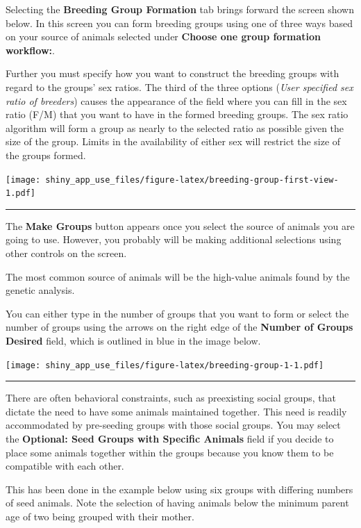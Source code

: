 \documentclass[
]{article}
\begin{document}
Selecting the \textbf{Breeding Group Formation} tab brings forward the
screen shown below. In this screen you can form breeding groups using
one of three ways based on your source of animals selected under
\textbf{Choose one group formation workflow:}.

Further you must specify how you want to construct the breeding groups
with regard to the groups' sex ratios. The third of the three options
(\emph{User specified sex ratio of breeders}) causes the appearance of
the field where you can fill in the sex ratio (F/M) that you want to
have in the formed breeding groups. The sex ratio algorithm will form a
group as nearly to the selected ratio as possible given the size of the
group. Limits in the availability of either sex will restrict the size
of the groups formed.

\texttt{[image: shiny\_app\_use\_files/figure-latex/breeding-group-first-view-1.pdf]}

\begin{center}\rule{0.5\linewidth}{\linethickness}\end{center}

The \textbf{Make Groups} button appears once you select the source of
animals you are going to use. However, you probably will be making
additional selections using other controls on the screen.

The most common source of animals will be the high-value animals found
by the genetic analysis.

You can either type in the number of groups that you want to form or
select the number of groups using the arrows on the right edge of the
\textbf{Number of Groups Desired} field, which is outlined in blue in
the image below.

\texttt{[image: shiny\_app\_use\_files/figure-latex/breeding-group-1-1.pdf]}

\begin{center}\rule{0.5\linewidth}{\linethickness}\end{center}

There are often behavioral constraints, such as preexisting social
groups, that dictate the need to have some animals maintained together.
This need is readily accommodated by pre-seeding groups with those
social groups. You may select the \textbf{Optional: Seed Groups with
Specific Animals} field if you decide to place some animals together
within the groups because you know them to be compatible with each
other.

This has been done in the example below using six groups with differing
numbers of seed animals. Note the selection of having animals below the
minimum parent age of two being grouped with their mother.
\end{document}
